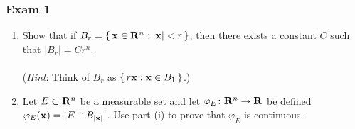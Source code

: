 \subsubsection{Exam 1}
\setcounter{exercise}{0}
\setcounter{equation}{0}


\begin{problem}
\end{problem}
\begin{solution}
\end{solution}

\begin{problem}
\end{problem}
\begin{solution}
\end{solution}

\begin{problem}
\hfill
\begin{enumerate}[label=(\roman*),noitemsep]
\item Show that if $B_r=\left\{\,\mathbf{x}\in\mathbf{R}^n:|\mathbf{x}|<r\,\right\}$,
  then there exists a constant $C$ such that $|B_r|=Cr^n$.
\\\\
(\emph{Hint}: Think of $B_r$ as $\left\{\,r\mathbf{x}:\mathbf{x}\in B_1\,\right\}$.)
\item Let $E\subset\mathbf{R}^n$ be a measurable set and let
  $\varphi_E\colon\mathbf{R}^n\to\mathbf{R}$ be defined
  $\varphi_E(\mathbf{x})=\left|E\cap B_{|\mathbf{x}|}\right|$. Use part (i) to prove
    that $\varphi_E$ is continuous.
\end{enumerate}
\end{problem}
